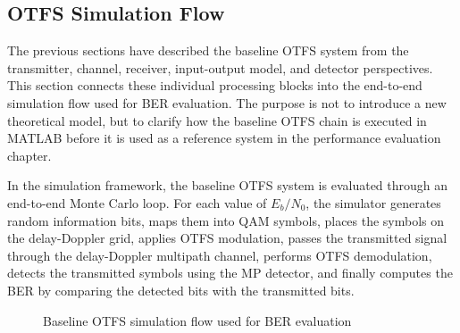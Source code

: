 \subsection{OTFS Simulation Flow}

The previous sections have described the baseline OTFS system from the transmitter, channel, receiver, input-output model, and detector perspectives. This section connects these individual processing blocks into the end-to-end simulation flow used for BER evaluation. The purpose is not to introduce a new theoretical model, but to clarify how the baseline OTFS chain is executed in MATLAB before it is used as a reference system in the performance evaluation chapter.

In the simulation framework, the baseline OTFS system is evaluated through an end-to-end Monte Carlo loop. For each value of \(E_b/N_0\), the simulator generates random information bits, maps them into QAM symbols, places the symbols on the delay-Doppler grid, applies OTFS modulation, passes the transmitted signal through the delay-Doppler multipath channel, performs OTFS demodulation, detects the transmitted symbols using the MP detector, and finally computes the BER by comparing the detected bits with the transmitted bits.

\begin{figure}[H]
    \centering
    \caption{Baseline OTFS simulation flow used for BER evaluation}
    \label{fig:baseline_otfs_simulation_flow}
\end{figure}

